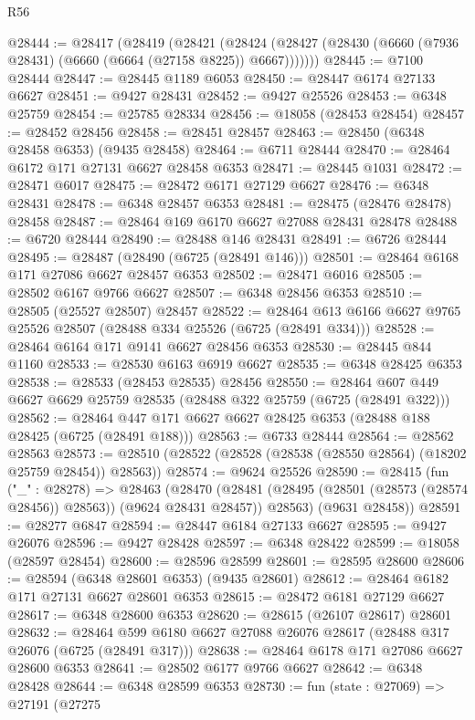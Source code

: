 \begin{lexlean}{R56}
\begin{coremodule}
@28444 := @28417
    (@28419
      (@28421
        (@28424 (@28427 (@28430 (@6660 (@7936 @28431) (@6660 (@6664 (@27158 @8225)) @6667)))))))
@28445 := @7100 @28444
@28447 := @28445 @1189 @6053
@28450 := @28447 @6174 @27133 @6627
@28451 := @9427 @28431
@28452 := @9427 @25526
@28453 := @6348 @25759
@28454 := @25785 @28334
@28456 := @18058 (@28453 @28454)
@28457 := @28452 @28456
@28458 := @28451 @28457
@28463 := @28450 (@6348 @28458 @6353) (@9435 @28458)
@28464 := @6711 @28444
@28470 := @28464 @6172 @171 @27131 @6627 @28458 @6353
@28471 := @28445 @1031
@28472 := @28471 @6017
@28475 := @28472 @6171 @27129 @6627
@28476 := @6348 @28431
@28478 := @6348 @28457 @6353
@28481 := @28475 (@28476 @28478) @28458
@28487 := @28464 @169 @6170 @6627 @27088 @28431 @28478
@28488 := @6720 @28444
@28490 := @28488 @146 @28431
@28491 := @6726 @28444
@28495 := @28487 (@28490 (@6725 (@28491 @146)))
@28501 := @28464 @6168 @171 @27086 @6627 @28457 @6353
@28502 := @28471 @6016
@28505 := @28502 @6167 @9766 @6627
@28507 := @6348 @28456 @6353
@28510 := @28505 (@25527 @28507) @28457
@28522 := @28464 @613 @6166 @6627 @9765 @25526 @28507 (@28488 @334 @25526 (@6725 (@28491 @334)))
@28528 := @28464 @6164 @171 @9141 @6627 @28456 @6353
@28530 := @28445 @844 @1160
@28533 := @28530 @6163 @6919 @6627
@28535 := @6348 @28425 @6353
@28538 := @28533 (@28453 @28535) @28456
@28550 := @28464 @607 @449 @6627 @6629 @25759 @28535 (@28488 @322 @25759 (@6725 (@28491 @322)))
@28562 := @28464 @447 @171 @6627 @6627 @28425 @6353 (@28488 @188 @28425 (@6725 (@28491 @188)))
@28563 := @6733 @28444
@28564 := @28562 @28563
@28573 := @28510 (@28522 (@28528 (@28538 (@28550 @28564) (@18202 @25759 @28454)) @28563))
@28574 := @9624 @25526
@28590 := @28415
    (fun ("_" : @28278) =>
    @28463
      (@28470
        (@28481 (@28495 (@28501 (@28573 (@28574 @28456)) @28563)) (@9624 @28431 @28457))
        @28563)
      (@9631 @28458))
@28591 := @28277 @6847
@28594 := @28447 @6184 @27133 @6627
@28595 := @9427 @26076
@28596 := @9427 @28428
@28597 := @6348 @28422
@28599 := @18058 (@28597 @28454)
@28600 := @28596 @28599
@28601 := @28595 @28600
@28606 := @28594 (@6348 @28601 @6353) (@9435 @28601)
@28612 := @28464 @6182 @171 @27131 @6627 @28601 @6353
@28615 := @28472 @6181 @27129 @6627
@28617 := @6348 @28600 @6353
@28620 := @28615 (@26107 @28617) @28601
@28632 := @28464 @599 @6180 @6627 @27088 @26076 @28617 (@28488 @317 @26076 (@6725 (@28491 @317)))
@28638 := @28464 @6178 @171 @27086 @6627 @28600 @6353
@28641 := @28502 @6177 @9766 @6627
@28642 := @6348 @28428
@28644 := @6348 @28599 @6353
@28730 := fun (state : @27069) =>
  @27191
    (@27275

\end{coremodule}
\end{lexlean}
